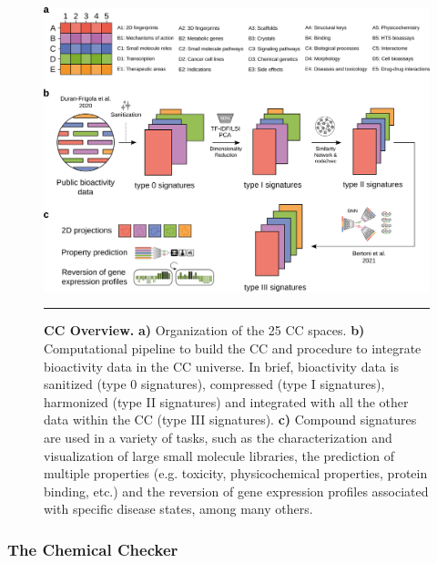 \begin{figure}[t!]
  \centering
  \includegraphics[width=\linewidth]{figures/Protocols/Main/CC.png}
  \caption{
    \textbf{CC Overview.} 
    \textbf{a)} Organization of the 25 CC spaces.
    \textbf{b)} Computational pipeline to build the CC and procedure to integrate bioactivity data in the CC universe. In brief, bioactivity data is sanitized (type 0 signatures), compressed (type I signatures), harmonized (type II signatures) and integrated with all the other data within the CC (type III signatures).
    \textbf{c)} Compound signatures are used in a variety of tasks, such as the characterization and visualization of large small molecule libraries, the prediction of multiple properties (e.g. toxicity, physicochemical properties, protein binding, etc.) and the reversion of gene expression profiles associated with specific disease states, among many others. 
  }
  \rule[0ex]{\textwidth}{0.5pt}
  \vspace{-5mm}
  \label{Protocols_Fig1}
\end{figure}



\subsubsection{The Chemical Checker}

